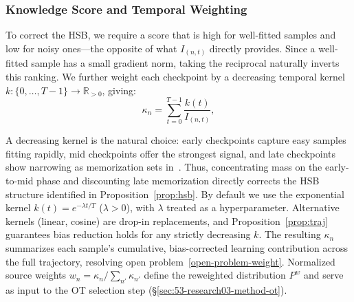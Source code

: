 \documentclass[12pt, a4paper, twoside]{book}
\numberwithin{equation}{chapter}
\theoremstyle{plain}
\theoremstyle{definition}
\theoremstyle{remark}
\newenvironment{foldable}{}{}
\begin{document}
\subsubsection{Knowledge Score and Temporal Weighting} \label{sec:53-research03-method-gradient-knowledge}
\begin{foldable} To correct the \ac{HSB}, we require a score that is high for well-fitted samples and low for noisy ones---the opposite of what $I_{(n,t)}$ directly provides.
  Since a well-fitted sample has a small gradient norm, taking the reciprocal naturally inverts this ranking.
  We further weight each checkpoint by a decreasing temporal kernel $k : \{0,\ldots,T-1\} \to \mathbb{R}_{>0}$, giving:
  \begin{equation}
    \kappa_n = \sum_{t=0}^{T-1} \frac{k(t)}{I_{(n,t)}},
    \label{eq:kappa}
  \end{equation}
\end{foldable}

\begin{foldable}
  A decreasing kernel is the natural choice: early checkpoints capture easy samples fitting rapidly, mid checkpoints offer the strongest signal, and late checkpoints show narrowing as memorization sets in~\cite{arpit2017closer}.
  Thus, concentrating mass on the early-to-mid phase and discounting late memorization directly corrects the \ac{HSB} structure identified in Proposition~\ref{prop:hsb}.
  By default we use the exponential kernel $k(t) = e^{-\lambda t / T}$ ($\lambda > 0$), with $\lambda$ treated as a hyperparameter.
  Alternative kernels (linear, cosine) are drop-in replacements, and Proposition~\ref{prop:traj} guarantees bias reduction holds for any strictly decreasing $k$.
  The resulting $\kappa_n$ summarizes each sample's cumulative, bias-corrected learning contribution across the full trajectory, resolving open problem~\ref{open-problem-weight}.
  Normalized source weights $w_n = \kappa_n / \sum_{n'} \kappa_{n'}$ define the reweighted distribution $P^w$ and serve as input to the \ac{OT} selection step (\S\ref{sec:53-research03-method-ot}).
\end{foldable}
\end{document}
